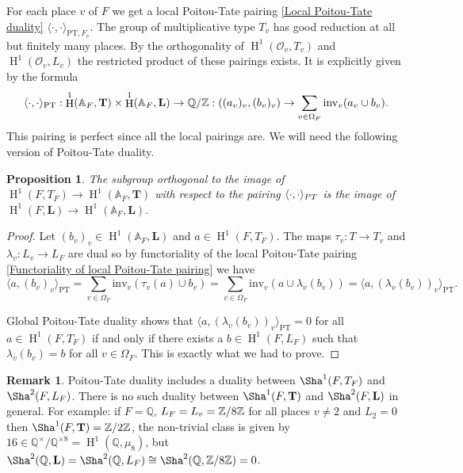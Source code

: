 \documentclass[a4paper,11pt,reqno]{amsart}
\newcommand{\Q}{\mathbb{Q}}
\newcommand{\A}{\mathbb{A}}
\DeclareMathOperator{\HH}{H}
\newtheorem{proposition}[theorem]{Proposition}
\theoremstyle{definition}
\newtheorem{remark}[theorem]{Remark}
\begin{document}
For each place $v$ of $F$ we get a local Poitou-Tate pairing \eqref{Local Poitou-Tate duality} $\langle \cdot, \cdot \rangle_{\text{PT}, F_v}$. The group of multiplicative type $T_v$ has good reduction at all but finitely many places. By the orthogonality of $\HH^1(\mathcal{O}_v, T_v)$ and $\HH^1(\mathcal{O}_v, L_v)$ the restricted product of these pairings exists. It is explicitly given by the formula
\begin{equation}
	\langle \cdot, \cdot \rangle_{\text{PT}}: \HH^1(\A_F, \mathbf{T}) \times \HH^1(\A_F, \mathbf{L}) \to \Q/\Z: ((a_v)_{v}, (b_v)_{v}) \to \sum_{v \in \Omega_F} \text{inv}_v(a_v \cup b_v).
	\label{Adelic Poitou-Tate pairing}
\end{equation}
This pairing is perfect since all the local pairings are. We will need the following version of Poitou-Tate duality.
\begin{proposition}
	The subgroup orthogonal to the image of $\HH^1(F, T_F) \to \HH^1(\A_F, \mathbf{T})$ with respect to the pairing $\langle \cdot, \cdot \rangle_{\emph{PT}}$ is the image of $\HH^1(F, \mathbf{L}) \to \HH^1(\A_F, \mathbf{L})$.
	\label{Global Poitou Tate for adelic groups of multiplicative type}
\end{proposition}
\begin{proof}
	Let $(b_v)_{v} \in \HH^1(\A_F, \mathbf{L})$ and $a \in \HH^1(F, T_F)$. The maps $\tau_v: T \to T_v$ and $\lambda_v: L_v \to L_F$ are dual so by functoriality of the local Poitou-Tate pairing \eqref{Functoriality of local Poitou-Tate pairing} we have 
	\begin{equation*}
		\langle a, (b_v)_v \rangle_{\text{PT}} = \sum_{v \in \Omega_F} \text{inv}_v(\tau_v(a) \cup b_v) = \sum_{v \in \Omega_F} \text{inv}_v(a \cup \lambda_v(b_v)) = \langle a,(\lambda_v(b_v))_v \rangle_{\text{PT}}.
	\end{equation*}
	
	Global Poitou-Tate duality \cite[Thm. 4.20]{Milne2006Duality} shows that $\langle a, (\lambda_v(b_v))_v \rangle_{\text{PT}} = 0$ for all $a \in \HH^1(F, T_F)$ if and only if there exists a $b \in \HH^1(F, L_F)$ such that $\lambda_v(b_v) = b$ for all $v \in \Omega_F$. This is exactly what we had to prove.
\end{proof}
\begin{remark}
		Poitou-Tate duality includes a duality between $\Sha^1(F, T_F)$ and $\Sha^2(F, L_F)$. There is no such duality between $\Sha^1(F, \mathbf{T})$ and $\Sha^2(F, \mathbf{L})$ in general. For example: if $F = \Q$, $L_F = L_v = \mathbb{Z}/8\mathbb{Z}$ for all places $v \neq 2$ and $L_2 = 0$ then $\Sha^1(F, \mathbf{T}) = \Z/2\Z$, the non-trivial class is given by $16 \in \Q^{\times}/ \Q^{\times 8} = \HH^1(\Q, \mu_8)$, but $\Sha^2(\Q, \mathbf{L}) = \Sha^2(\Q, L_F) \cong \Sha^2(\Q, \Z/8 \Z) =  0$. 
\end{remark}
\end{document}
